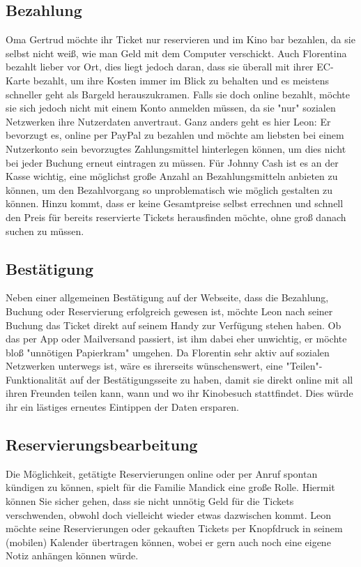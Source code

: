 \subsection{Bezahlung}
Oma Gertrud möchte ihr Ticket nur reservieren und im Kino bar bezahlen, da sie selbst nicht weiß, wie man Geld mit dem Computer verschickt.
Auch Florentina bezahlt lieber vor Ort, dies liegt jedoch daran, dass sie überall mit ihrer EC-Karte bezahlt, um ihre Kosten immer im Blick zu behalten und es meistens schneller geht als Bargeld herauszukramen.
Falls sie doch online bezahlt, möchte sie sich jedoch nicht mit einem Konto anmelden müssen, da sie "nur" sozialen Netzwerken ihre Nutzerdaten anvertraut.
Ganz anders geht es hier Leon: Er bevorzugt es, online per PayPal zu bezahlen und möchte am liebsten bei einem Nutzerkonto sein bevorzugtes Zahlungsmittel hinterlegen können, um dies nicht bei jeder Buchung erneut eintragen zu müssen.
Für Johnny Cash ist es an der Kasse wichtig, eine möglichst große Anzahl an Bezahlungsmitteln anbieten zu können, um den Bezahlvorgang so unproblematisch wie möglich gestalten zu können.
Hinzu kommt, dass er keine Gesamtpreise selbst errechnen und schnell den Preis für bereits reservierte Tickets herausfinden möchte, ohne groß danach suchen zu müssen.

\subsection{Bestätigung}
Neben einer allgemeinen Bestätigung auf der Webseite, dass die Bezahlung, Buchung oder Reservierung erfolgreich gewesen ist, möchte Leon nach seiner Buchung das Ticket direkt auf seinem Handy zur Verfügung stehen haben.
Ob das per App oder Mailversand passiert, ist ihm dabei eher unwichtig, er möchte bloß "unnötigen Papierkram" umgehen.
Da Florentin sehr aktiv auf sozialen Netzwerken unterwegs ist, wäre es ihrerseits wünschenswert, eine "Teilen"-Funktionalität auf der Bestätigungsseite zu haben, damit sie direkt online mit all ihren Freunden teilen kann, wann und wo ihr Kinobesuch stattfindet.
Dies würde ihr ein lästiges erneutes Eintippen der Daten ersparen.

\subsection{Reservierungsbearbeitung}
Die Möglichkeit, getätigte Reservierungen online oder per Anruf spontan kündigen zu können, spielt für die Familie Mandick eine große Rolle.
Hiermit können Sie sicher gehen, dass sie nicht unnötig Geld für die Tickets verschwenden, obwohl doch vielleicht wieder etwas dazwischen kommt.
Leon möchte seine Reservierungen oder gekauften Tickets per Knopfdruck in seinem (mobilen) Kalender übertragen können, wobei er gern auch noch eine eigene Notiz anhängen können würde.


